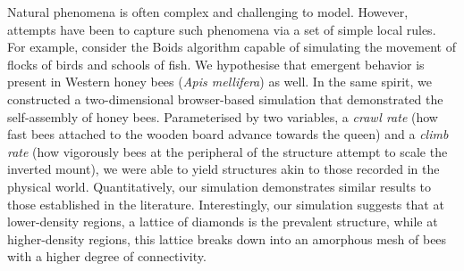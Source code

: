 \documentclass{article}
\begin{document}
Natural phenomena is often complex and challenging to model. However, attempts
have been to capture such phenomena via a set of simple local rules. For
example, consider the Boids algorithm capable of simulating the movement of flocks
of birds and schools of fish. We hypothesise that emergent behavior is present
in Western honey bees (\textit{Apis mellifera}) as well. In the same spirit, we
constructed a two-dimensional browser-based simulation that demonstrated the
self-assembly of honey bees. Parameterised by two variables, a \textit{crawl rate}
(how fast bees attached to the wooden board advance towards the queen) and
a \textit{climb rate} (how vigorously bees at the peripheral of the structure attempt
to scale the inverted mount), we were able to yield structures akin to those
recorded in the physical world. Quantitatively, our simulation demonstrates
similar results to those established in the literature. Interestingly, our
simulation suggests that at lower-density regions, a lattice of diamonds
is the prevalent structure, while at higher-density regions, this lattice
breaks down into an amorphous mesh of bees with a higher degree of connectivity.
\end{document}
